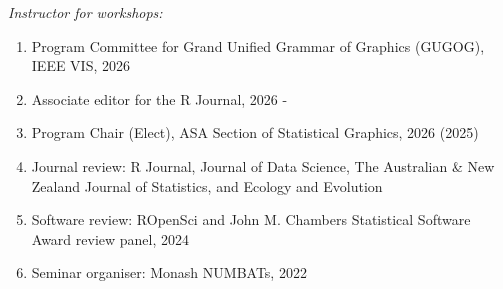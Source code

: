\documentclass[10pt,a4paper]{article} %
\begin{document}
\vspace{0.7em}


\vspace{0.7em}

\noindent\textit{Instructor for workshops: }\vspace{-0.5em}

\vspace{0.7em}



\begin{enumerate}[itemsep=0.1em]

    \item Program Committee for Grand Unified Grammar of Graphics (GUGOG), IEEE VIS, 2026

    \item Associate editor for the R Journal, 2026 - 

    \item Program Chair (Elect), ASA Section of Statistical Graphics, 2026 (2025)

    \item Journal review: R Journal, Journal of Data Science, The Australian \& New Zealand Journal of Statistics, and Ecology and Evolution

    \item Software review: ROpenSci and John M. Chambers Statistical Software Award review panel, 2024

    \item Seminar organiser: Monash NUMBATs, 2022


\end{enumerate}   

\end{document}
